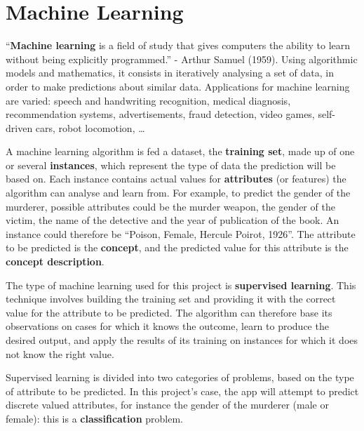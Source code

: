 \documentclass{mproj}
\begin{document}
\section{Machine Learning}\label{machine_learning}
``\textbf{Machine learning} is a field of study that gives computers the ability to learn without being explicitly programmed.'' - Arthur Samuel (1959). \cite[Chapter~3]{quotearthursamuel} Using algorithmic models and mathematics, it consists in iteratively analysing a set of data, in order to make predictions about similar data. Applications for machine learning are varied: speech and handwriting recognition, medical diagnosis, recommendation systems, advertisements, fraud detection, video games, self-driven cars, robot locomotion, \ldots \par 

A machine learning algorithm is fed a dataset, the \textbf{training set}, made up of one or several \textbf{instances}, which represent the type of data the prediction will be based on. Each instance contains actual values for \textbf{attributes} (or features) the algorithm can analyse and learn from. \cite[Chapter~2]{wekabook} For example, to predict the gender of the murderer, possible attributes could be the murder weapon, the gender of the victim, the name of the detective and the year of publication of the book. An instance could therefore be ``Poison, Female, Hercule Poirot, 1926''. The attribute to be predicted is the \textbf{concept}, and the predicted value for this attribute is the \textbf{concept description}. \par 

The type of machine learning used for this project is \textbf{supervised learning}. This technique involves building the training set and providing it with the correct value for the attribute to be predicted. \cite{machinelearningcourse} The algorithm can therefore base its observations on cases for which it knows the outcome, learn to produce the desired output, and apply the results of its training on instances for which it does not know the right value. \par

Supervised learning is divided into two categories of problems, based on the type of attribute to be predicted. In this project's case, the app will attempt to predict discrete valued attributes, for instance the gender of the murderer (male or female): this is a \textbf{classification} problem. 


\end{document}
